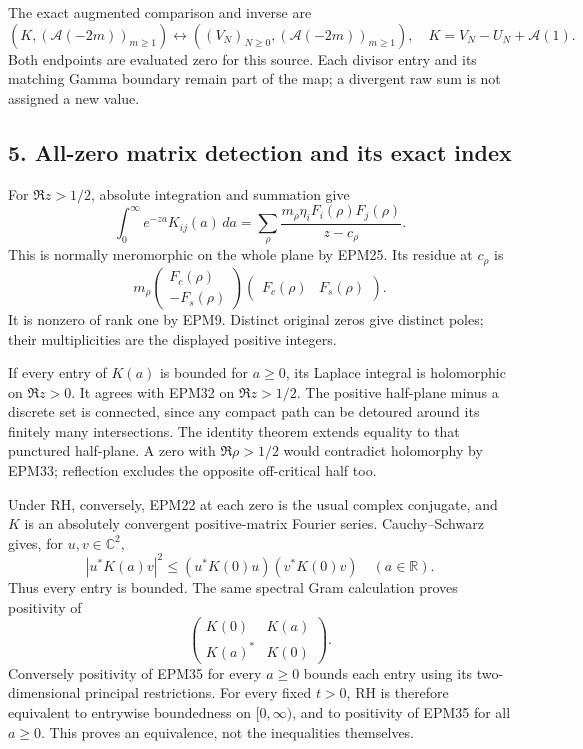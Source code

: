 \documentclass[
  10pt,
  a4paper,
]{article}
\begin{document}
The exact augmented comparison and inverse are \[
(K,(\mathcal A(-2m))_{m\ge1})
\longleftrightarrow
((V_N)_{N\ge0},(\mathcal A(-2m))_{m\ge1}),\quad
K=V_N-U_N+\mathcal A(1).
\tag{EPM31}
\] Both endpoints are evaluated zero for this source. Each divisor entry
and its matching Gamma boundary remain part of the map; a divergent raw
sum is not assigned a new value.

\subsection{5. All-zero matrix detection and its exact
index}\label{all-zero-matrix-detection-and-its-exact-index}

For \(\Re z>1/2\), absolute integration and summation give \[
\int_0^\infty e^{-za}K_{ij}(a)\,da
=\sum_\rho\frac{m_\rho\eta_iF_i(\rho)F_j(\rho)}{z-c_\rho}.
\tag{EPM32}
\] This is normally meromorphic on the whole plane by EPM25. Its residue
at \(c_\rho\) is \[
m_\rho
\begin{pmatrix}F_c(\rho)\\-F_s(\rho)\end{pmatrix}
\begin{pmatrix}F_c(\rho)&F_s(\rho)\end{pmatrix}.
\tag{EPM33}
\] It is nonzero of rank one by EPM9. Distinct original zeros give
distinct poles; their multiplicities are the displayed positive
integers.

If every entry of \(K(a)\) is bounded for \(a\ge0\), its Laplace
integral is holomorphic on \(\Re z>0\). It agrees with EPM32 on
\(\Re z>1/2\). The positive half-plane minus a discrete set is
connected, since any compact path can be detoured around its finitely
many intersections. The identity theorem extends equality to that
punctured half-plane. A zero with \(\Re\rho>1/2\) would contradict
holomorphy by EPM33; reflection excludes the opposite off-critical half
too.

Under RH, conversely, EPM22 at each zero is the usual complex conjugate,
and \(K\) is an absolutely convergent positive-matrix Fourier series.
Cauchy--Schwarz gives, for \(u,v\in\mathbb C^2\), \[
|u^*K(a)v|^2\le(u^*K(0)u)(v^*K(0)v)\quad(a\in\mathbb R).
\tag{EPM34}
\] Thus every entry is bounded. The same spectral Gram calculation
proves positivity of \[
\begin{pmatrix}K(0)&K(a)\\K(a)^*&K(0)\end{pmatrix}.
\tag{EPM35}
\] Conversely positivity of EPM35 for every \(a\ge0\) bounds each entry
using its two-dimensional principal restrictions. For every fixed
\(t>0\), RH is therefore equivalent to entrywise boundedness on
\([0,\infty)\), and to positivity of EPM35 for all \(a\ge0\). This
proves an equivalence, not the inequalities themselves.
\end{document}
